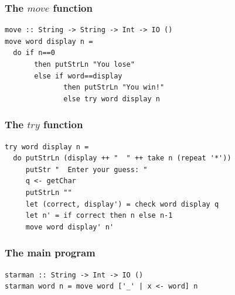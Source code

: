 \documentclass{beamer}
\begin{document}
\begin{frame}[fragile]
\frametitle{The $move$ function}

\begin{verbatim}
move :: String -> String -> Int -> IO ()
move word display n =
  do if n==0
       then putStrLn "You lose"
       else if word==display
              then putStrLn "You win!"
              else try word display n
\end{verbatim}

\end{frame}

\begin{frame}[fragile]
\frametitle{The $try$ function}

\begin{verbatim}
try word display n =
  do putStrLn (display ++ "  " ++ take n (repeat '*'))
     putStr "  Enter your guess: "
     q <- getChar
     putStrLn ""
     let (correct, display') = check word display q
     let n' = if correct then n else n-1
     move word display' n'
\end{verbatim}
\end{frame}

\begin{frame}[fragile]
\frametitle{The main program}

\begin{verbatim}
starman :: String -> Int -> IO ()
starman word n = move word ['_' | x <- word] n
\end{verbatim}

\end{frame}
\end{document}
